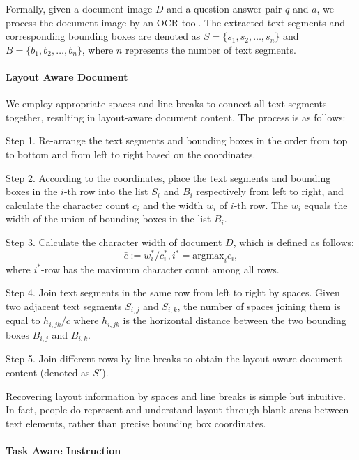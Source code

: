 \documentclass[letterpaper]{article} \usepackage{aaai24_preprint}  \usepackage{times}  \usepackage{helvet}  \usepackage{courier}  \usepackage[hyphens]{url}  \usepackage{graphicx} \urlstyle{rm} \def\UrlFont{\rm}  \usepackage{natbib}  \usepackage{caption} \frenchspacing  \setlength{\pdfpagewidth}{8.5in} \setlength{\pdfpageheight}{11in} \usepackage{algorithm}
\begin{document}
Formally, given a document image $D$ and a question answer pair $q$ and $a$, we process the document image by an OCR tool.
The extracted text segments and corresponding bounding boxes are denoted as $S=\{s_1,s_2,\dots,s_n\}$ and $B=\{b_1,b_2,\dots,b_n\}$, where $n$ represents the number of text segments.

\paragraph{Layout Aware Document}
We employ appropriate spaces and line breaks to connect all text segments together, resulting in layout-aware document content.
The process is as follows:

Step 1.
Re-arrange the text segments and bounding boxes in the order from top to bottom and from left to right based on the coordinates.

Step 2.
According to the coordinates, place the text segments and bounding boxes in the $i$-th row into the list $S_i$ and $B_i$ respectively from left to right, and calculate the character count $c_i$ and the width $w_i$ of $i$-th row.
The $w_i$ equals the width of the union of bounding boxes in the list $B_i$.

Step 3.
Calculate the character width of document $D$, which is defined as follows:
\begin{equation}
\label{eq:mean_c}
\bar{c}:=w_i^* / c_i^*, i^*=\text{argmax}_i c_i,
\end{equation}
where $i^*$-row has the maximum character count among all rows.

Step 4.
Join text segments in the same row from left to right by spaces.
Given two adjacent text segments $S_{i,j}$ and $S_{i,k}$, the number of spaces joining them is equal to $h_{i,jk}/\bar{c}$ where $h_{i,jk}$ is the horizontal distance between the two bounding boxes $B_{i,j}$ and $B_{i,k}$.

Step 5.
Join different rows by line breaks to obtain the layout-aware document content (denoted as $S'$).

Recovering layout information by spaces and line breaks is simple but intuitive.
In fact, people do represent and understand layout through blank areas between text elements, rather than precise bounding box coordinates.







\paragraph{Task Aware Instruction}
\label{sec:task}
\end{document}
